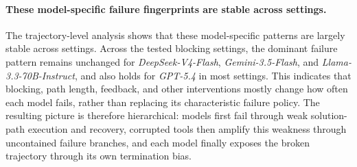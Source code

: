 \paragraph{These model-specific failure fingerprints are stable across settings.}
The trajectory-level analysis shows that these model-specific patterns are largely stable across settings.
Across the tested blocking settings, the dominant failure pattern remains unchanged for \textit{DeepSeek-V4-Flash}, \textit{Gemini-3.5-Flash}, and \textit{Llama-3.3-70B-Instruct}, and also holds for \textit{GPT-5.4} in most settings.
This indicates that blocking, path length, feedback, and other interventions mostly change how often each model fails, rather than replacing its characteristic failure policy.
The resulting picture is therefore hierarchical: models first fail through weak solution-path execution and recovery, corrupted tools then amplify this weakness through uncontained failure branches, and each model finally exposes the broken trajectory through its own termination bias.




